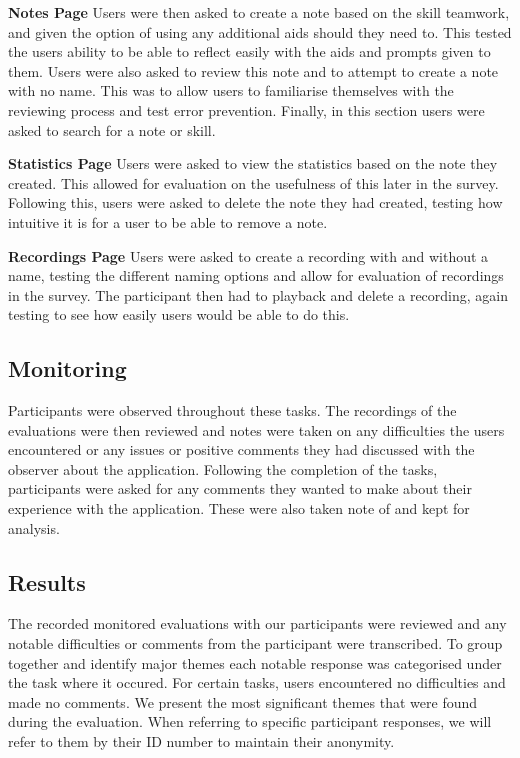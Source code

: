 \documentclass{l4proj}
\begin{document}
\textbf{Notes Page} Users were then asked to create a note based on the skill teamwork, and given the option of using any additional aids should they need to. This tested the users ability to be able to reflect easily with the aids and prompts given to them. Users were also asked to review this note and to attempt to create a note with no name. This was to allow users to familiarise themselves with the reviewing process and test error prevention. Finally, in this section users were asked to search for a note or skill.
 
\textbf{Statistics Page} Users were asked to view the statistics based on the note they created. This allowed for evaluation on the usefulness of this later in the survey. Following this, users were asked to delete the note they had created, testing how intuitive it is for a user to be able to remove a note.

\textbf{Recordings Page} Users were asked to create a recording with and without a name, testing the different naming options and allow for evaluation of recordings in the survey. The participant then had to playback and delete a recording, again testing to see how easily users would be able to do this.

\subsection{Monitoring}
Participants were observed throughout these tasks. The recordings of the evaluations were then reviewed and notes were taken on any difficulties the users encountered or any issues or positive comments they had discussed with the observer about the application. Following the completion of the tasks, participants were asked for any comments they wanted to make about their experience with the application. These were also taken note of and kept for analysis.

\subsection{Results}

The recorded monitored evaluations with our participants were reviewed and any notable difficulties or comments from the participant were transcribed. To group together and identify major themes each notable response was categorised under the task where it occured. For certain tasks, users encountered no difficulties and made no comments. We present the most significant themes that were found during the evaluation. When referring to specific participant responses, we will refer to them by their ID number to maintain their anonymity.
\end{document}
